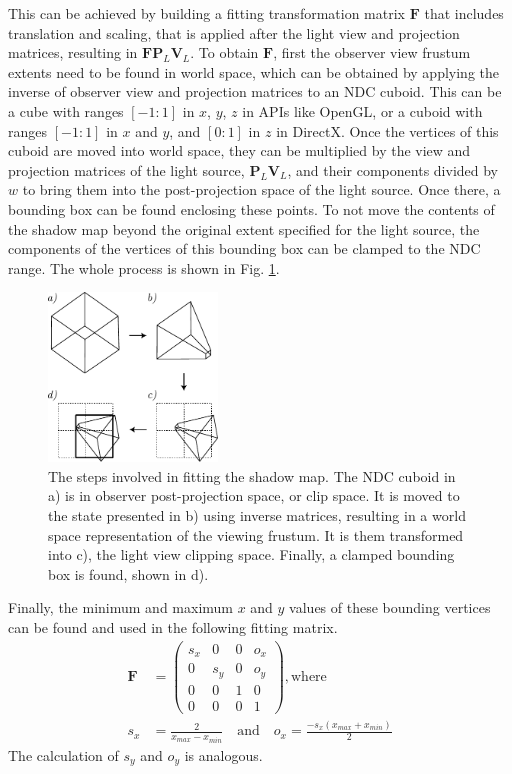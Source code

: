 This can be achieved by building a fitting transformation matrix \(\mathbf{F}\) that includes translation and scaling, that is applied after the light view and projection matrices, resulting in \(\mathbf{F}\mathbf{P}_L\mathbf{V}_L\). To obtain \(\mathbf{F}\), first the observer view frustum extents need to be found in world space, which can be obtained by applying the inverse of observer view and projection matrices to an NDC cuboid. This can be a cube with ranges \([-1:1]\) in \(x\), \(y\), \(z\) in APIs like OpenGL, or a cuboid with ranges \([-1:1]\) in \(x\) and \(y\), and \([0:1]\) in \(z\) in DirectX. Once the vertices of this cuboid are moved into world space, they can be multiplied by the view and projection matrices of the light source, \(\mathbf{P}_L\mathbf{V}_L\), and their components divided by \(w\) to bring them into the post-projection space of the light source. Once there, a bounding box can be found enclosing these points. To not move the contents of the shadow map beyond the original extent specified for the light source, the components of the vertices of this bounding box can be clamped to the NDC range. The whole process is shown in Fig. \ref{fig:shadow_map_fitting}.
\begin{figure}
    \centering
	\includegraphics[width=0.4\textwidth]{./graf/shadow_map_focusing.pdf}
	\caption{The steps involved in fitting the shadow map. The NDC cuboid in a) is in observer post-projection space, or clip space. It is moved to the state presented in b) using inverse matrices, resulting in a world space representation of the viewing frustum. It is them transformed into c), the light view clipping space. Finally, a clamped bounding box is found, shown in d).}
	\label{fig:shadow_map_fitting}
\end{figure}
Finally, the minimum and maximum \(x\) and \(y\) values of these bounding vertices can be found and used in the following fitting matrix.
\begin{align}
	\mathbf{F} &= 
	\begin{pmatrix}
		s_x & 0 & 0 & o_x\\
		0 & s_y & 0 & o_y\\
		0 & 0 & 1 & 0\\
		0 & 0 & 0 & 1
	\end{pmatrix}, \text{where}\\[10pt]
	s_x &= \frac{2}{x_{max} - x_{min}} \quad\text{and}\quad o_x = \frac{-s_x(x_{max} + x_{min})}{2}
\end{align}
The calculation of \(s_y\) and \(o_y\) is analogous.

